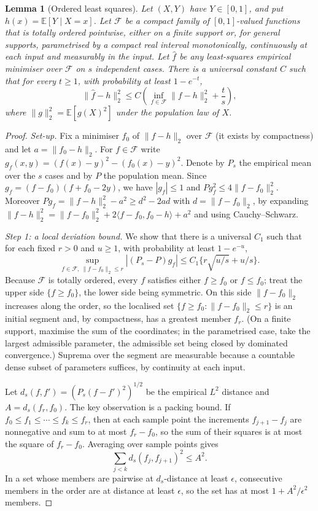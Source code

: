 \documentclass[11pt,a4paper]{article}
\newtheorem{lemma}[theorem]{Lemma}
\theoremstyle{remark}
\newcommand{\E}{\mathbb E}
\newcommand{\cF}{\mathcal F}
\begin{document}
\begin{lemma}[Ordered least squares]\label{lem:chain}
Let $(X,Y)$ have $Y\in[0,1]$, and put $h(x)=\E[Y\mid X=x]$. Let $\cF$ be a compact family of $[0,1]$-valued functions that is totally ordered pointwise, either on a finite support or, for general supports, parametrised by a compact real interval monotonically, continuously at each input and measurably in the input. Let $\widehat f$ be any least-squares empirical minimiser over $\cF$ on $s$ independent cases. There is a universal constant $C$ such that for every $t\ge1$, with probability at least $1-e^{-t}$,
\[
 \|\widehat f-h\|_2^2\le C\left(\inf_{f\in\cF}\|f-h\|_2^2+\frac{t}{s}\right),
\]
where $\|g\|_2^2=\E[g(X)^2]$ under the population law of $X$.
\end{lemma}

\begin{proof}
\emph{Set-up.} Fix a minimiser $f_0$ of $\|f-h\|_2$ over $\cF$ (it exists by compactness) and let $a=\|f_0-h\|_2$. For $f\in\cF$ write $g_f(x,y)=(f(x)-y)^2-(f_0(x)-y)^2$. Denote by $P_s$ the empirical mean over the $s$ cases and by $P$ the population mean. Since $g_f=(f-f_0)(f+f_0-2y)$, we have $|g_f|\le1$ and $Pg_f^2\le4\|f-f_0\|_2^2$. Moreover $Pg_f=\|f-h\|_2^2-a^2\ge d^2-2ad$ with $d=\|f-f_0\|_2$, by expanding $\|f-h\|_2^2=\|f-f_0\|_2^2+2\langle f-f_0,f_0-h\rangle+a^2$ and using Cauchy--Schwarz.

\emph{Step 1: a local deviation bound.} We show that there is a universal $C_1$ such that for each fixed $r>0$ and $u\ge1$, with probability at least $1-e^{-u}$,
\begin{equation}\label{eq:local}
 \sup_{f\in\cF,\ \|f-f_0\|_2\le r}|(P_s-P)g_f|
 \le C_1\{r\sqrt{u/s}+u/s\}.
\end{equation}
Because $\cF$ is totally ordered, every $f$ satisfies either $f\ge f_0$ or $f\le f_0$; treat the upper side $\{f\ge f_0\}$, the lower side being symmetric. On this side $\|f-f_0\|_2$ increases along the order, so the localised set $\{f\ge f_0:\|f-f_0\|_2\le r\}$ is an initial segment and, by compactness, has a greatest member $f_r$. (On a finite support, maximise the sum of the coordinates; in the parametrised case, take the largest admissible parameter, the admissible set being closed by dominated convergence.) Suprema over the segment are measurable because a countable dense subset of parameters suffices, by continuity at each input.

Let $d_s(f,f')=(P_s(f-f')^2)^{1/2}$ be the empirical $L^2$ distance and $A=d_s(f_r,f_0)$. The key observation is a packing bound. If $f_0\le f_1\le\cdots\le f_k\le f_r$, then at each sample point the increments $f_{j+1}-f_j$ are nonnegative and sum to at most $f_r-f_0$, so the sum of their squares is at most the square of $f_r-f_0$. Averaging over sample points gives
\[
 \sum_{j<k}d_s(f_j,f_{j+1})^2\le A^2 .
\]
In a set whose members are pairwise at $d_s$-distance at least $\epsilon$, consecutive members in the order are at distance at least $\epsilon$, so the set has at most $1+A^2/\epsilon^2$ members.


\end{proof}
\end{document}
